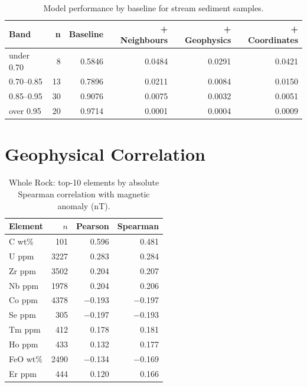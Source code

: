 \begin{table}[H]
\centering
\begin{tabular}{l r r r r r}
\hline
\textbf{Band} & \textbf{n} & \textbf{Baseline} & \textbf{+ Neighbours} & \textbf{+ Geophysics} & \textbf{+ Coordinates} \\
\hline
under 0.70 & 8  & 0.5846 & 0.0484 & 0.0291 & 0.0421 \\
0.70--0.85 & 13 & 0.7896 & 0.0211 & 0.0084 & 0.0150 \\
0.85--0.95 & 30 & 0.9076 & 0.0075 & 0.0032 & 0.0051 \\
over 0.95  & 20 & 0.9714 & 0.0001 & 0.0004 & 0.0009 \\
\hline
\end{tabular}
\caption{Model performance by baseline for stream sediment samples.}
\label{tab:stream-sediment-bands}
\end{table}


\section{Geophysical Correlation}



\begin{table}[H]
  \centering
  \caption{Whole Rock: top-10 elements by absolute Spearman correlation with magnetic anomaly (nT).}
  \label{tab:wr-magnetic}
  \begin{tabular}{lrrr}
    \toprule
    Element & $n$ & Pearson & Spearman \\
    \midrule
    C wt\%   & 101  & 0.596      & 0.481 \\
    U ppm    & 3227 & 0.283      & 0.284 \\
    Zr ppm   & 3502 & 0.204      & 0.207 \\
    Nb ppm   & 1978 & 0.204      & 0.206 \\
    Co ppm   & 4378 & $-$0.193   & $-$0.197 \\
    Se ppm   & 305  & $-$0.197   & $-$0.193 \\
    Tm ppm   & 412  & 0.178      & 0.181 \\
    Ho ppm   & 433  & 0.132      & 0.177 \\
    FeO wt\% & 2490 & $-$0.134   & $-$0.169 \\
    Er ppm   & 444  & 0.120      & 0.166 \\
    \bottomrule
  \end{tabular}
\end{table}

